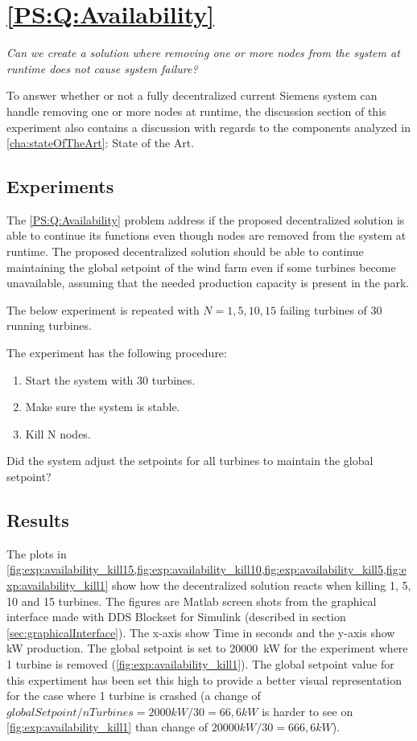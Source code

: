 \section{\ref{PS:Q:Availability}}

\textit{Can we create a solution where removing one or more nodes from the system at runtime does not cause system failure?}\newline\newline

\noindent To answer whether or not a fully decentralized current Siemens system can handle removing one or more nodes at runtime, the discussion section of this experiment also contains a discussion with regards to the components analyzed in \cref{cha:stateOfTheArt}: State of the Art.

\subsection{Experiments}
The \ref{PS:Q:Availability} problem address if the proposed decentralized solution is able to continue its functions even though nodes are removed from the system at runtime.
The proposed decentralized solution should be able to continue maintaining the global setpoint of the wind farm even if some turbines become unavailable, assuming that the needed production capacity is present in the park.

The below experiment is repeated with $N = 1, 5, 10, 15$ failing turbines of 30 running turbines.

The experiment has the following procedure:
\begin{enumerate}
	\item Start the system with 30 turbines.
	\item Make sure the system is stable.
	\item Kill N nodes.
\end{enumerate}

Did the system adjust the setpoints for all turbines to maintain the global setpoint?

\subsection{Results}
\label{sec:res:availability}
The plots in \cref{fig:exp:availability_kill15,fig:exp:availability_kill10,fig:exp:availability_kill5,fig:exp:availability_kill1} show how the decentralized solution reacts when killing 1, 5, 10 and 15 turbines. The figures are Matlab screen shots from the graphical interface made with DDS Blockset for Simulink (described in section \cref{sec:graphicalInterface}). The x-axis show Time in seconds and the y-axis show kW production.  The global setpoint is set to 20000~kW for the experiment where 1 turbine is removed (\cref{fig:exp:availability_kill1}). The global setpoint value for this expertiment has been set this high to provide a better visual representation for the case where 1 turbine is crashed (a change of $globalSetpoint/nTurbines=2000kW/30=66,6kW$ is harder to see on \cref{fig:exp:availability_kill1} than change of $20000kW/30=666,6kW$). 

